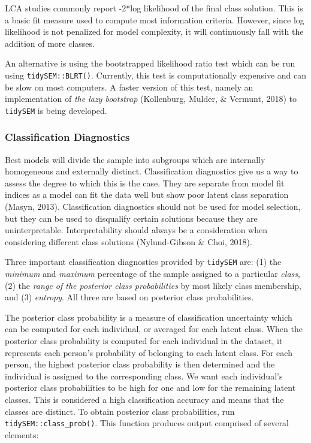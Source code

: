 \documentclass[
  ,man,floatsintext]{apa6}
\begin{document}
LCA studies commonly report -2*log likelihood of the final class
solution. This is a basic fit measure used to compute most information
criteria. However, since log likelihood is not penalized for model
complexity, it will continuously fall with the addition of more classes.

An alternative is using the bootstrapped likelihood ratio test which can
be run using \texttt{tidySEM::BLRT()}. Currently, this test is computationally
expensive and can be slow on most computers. A faster version of this
test, namely an implementation of \emph{the lazy bootstrap}
(Kollenburg, Mulder, \& Vermunt, 2018) to \texttt{tidySEM} is being developed.

\hypertarget{classification-diagnostics}{%
\subsubsection{Classification Diagnostics}\label{classification-diagnostics}}

Best models will divide the sample into subgroups which are internally
homogeneous and externally distinct. Classification diagnostics give us
a way to assess the degree to which this is the case. They are separate
from model fit indices as a model can fit the data well but show poor
latent class separation (Masyn, 2013). Classification diagnostics
should not be used for model selection, but they can be used to
disqualify certain solutions because they are uninterpretable.
Interpretability should always be a consideration when considering
different class solutions (Nylund-Gibson \& Choi, 2018).

Three important classification diagnostics provided by \texttt{tidySEM} are:
(1) the \emph{minimum} and \emph{maximum} percentage of the sample assigned to a
particular \emph{class}, (2) the \emph{range of the posterior class probabilities} by most likely class membership, and (3) \emph{entropy}. All three are based
on posterior class probabilities.

The posterior class probability is a measure of classification
uncertainty which can be computed for each individual, or averaged for
each latent class. When the posterior class probability is computed for
each individual in the dataset, it represents each person's probability
of belonging to each latent class. For each person, the highest
posterior class probability is then determined and the individual is
assigned to the corresponding class. We want each individual's posterior
class probabilities to be high for one and low for the remaining latent
classes. This is considered a high classification accuracy and means
that the classes are distinct. To obtain posterior class probabilities,
run \texttt{tidySEM::class\_prob()}. This function produces output comprised of
several elements:
\end{document}
